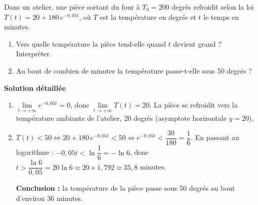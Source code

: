 \documentclass[11pt]{article}
\begin{document}
\begin{exoresolu}
Dans un atelier, une pièce sortant du four à $T_0 = 200$ degrés refroidit selon la loi $T(t) = 20 + 180\, e^{-0,05t}$, où $T$ est la température en degrés et $t$ le temps en minutes.
\begin{enumerate}
    \item Vers quelle température la pièce tend-elle quand $t$ devient grand ? Interpréter.
    \item Au bout de combien de minutes la température passe-t-elle sous 50 degrés ?
\end{enumerate}
\tcblower
\textbf{Solution détaillée}
\begin{enumerate}
    \item $\lim\limits_{t\to +\infty} e^{-0,05t} = 0$, donc $\lim\limits_{t\to +\infty} T(t) = 20$. La pièce se refroidit vers la température ambiante de l'atelier, 20 degrés (asymptote horizontale $y=20$).
    \item $T(t) < 50 \iff 20 + 180\, e^{-0,05t} < 50 \iff e^{-0,05t} < \dfrac{30}{180} = \dfrac16$.
    En passant au logarithme : $-0,05t < \ln\dfrac16 = -\ln 6$, donc $t > \dfrac{\ln 6}{0,05} = 20\ln 6 \approx 20\times 1,792 \approx 35,8$ minutes.

    \textbf{Conclusion :} la température de la pièce passe sous 50 degrés au bout d'environ 36 minutes.
\end{enumerate}
\end{exoresolu}
\end{document}
